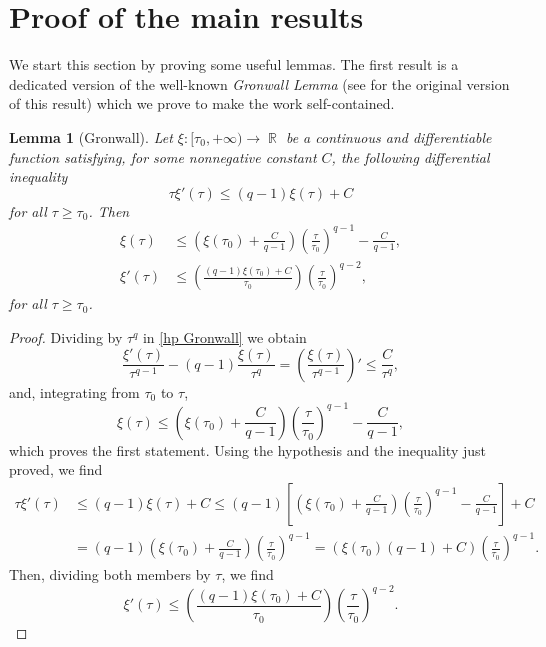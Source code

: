 \documentclass[12pt]{article}
\theoremstyle{definition}
\theoremstyle{plain}
\newtheorem{lemma}[teorema]{Lemma}
\theoremstyle{definition}
\DeclareMathOperator{\R}{\mathbb{R}}
\begin{document}
\section{Proof of the main results}\label{section4}
We start this section by proving some useful lemmas. The first result is a dedicated version of the well-known \emph{Gronwall Lemma} (see \cite{G} for the original version of this result) which we prove to make the work self-contained.
\begin{lemma}[Gronwall]\label{gronwall lemma}
    Let $\xi:[\tau_0,+\infty)\rightarrow\R$ be a continuous and differentiable function satisfying, for some nonnegative constant $C$, the following differential inequality
    \begin{equation}\label{hp Gronwall}
        \tau\xi'(\tau)\leq(q-1)\xi(\tau)+C
    \end{equation}
    for all $\tau\geq\tau_0$. Then
    \begin{equation*}
        \begin{split}
            \xi(\tau)&\leq \left(\xi(\tau_0)+\frac{C}{q-1} \right)\left(\frac{\tau}{\tau_0} \right)^{q-1}-\frac{C}{q-1},\\
            \xi'(\tau)&\leq \left(\frac{(q-1)\xi(\tau_0)+C}{\tau_0} \right)\left(\frac{\tau}{\tau_0} \right)^{q-2},
        \end{split}
    \end{equation*}
    for all $\tau\geq\tau_0$.
\end{lemma}
\begin{proof}
    Dividing by $\tau^{q}$ in \eqref{hp Gronwall} we obtain
    \begin{equation*}
        \frac{\xi'(\tau)}{\tau^{q-1}}-(q-1)\frac{\xi(\tau)}{\tau^{q}}=\left(\frac{\xi(\tau)}{\tau^{q-1}}\right)' \leq \frac{C}{\tau^{q}},
    \end{equation*}
    and, integrating from $\tau_0$ to $\tau$,
    \begin{equation*}
        \xi(\tau)\leq \left(\xi(\tau_0)+\frac{C}{q-1} \right)\left(\frac{\tau}{\tau_0} \right)^{q-1}-\frac{C}{q-1},
    \end{equation*}
    which proves the first statement. Using the hypothesis and the inequality just proved, we find
    \begin{equation*}
        \begin{split}
            \tau\xi'(\tau)&\leq(q-1)\xi(\tau)+C\leq(q-1)\left[\left(\xi(\tau_0)+\frac{C}{q-1} \right)\left(\frac{\tau}{\tau_0} \right)^{q-1}-\frac{C}{q-1}\right]+C\\
            &=(q-1)\left(\xi(\tau_0)+\frac{C}{q-1} \right)\left(\frac{\tau}{\tau_0} \right)^{q-1}=(\xi(\tau_0)(q-1)+C)\left(\frac{\tau}{\tau_0} \right)^{q-1}.
        \end{split}
    \end{equation*}
    Then, dividing both members by $\tau$, we find
    \begin{equation*}
        \xi'(\tau)\leq \left(\frac{(q-1)\xi(\tau_0)+C}{\tau_0} \right)\left(\frac{\tau}{\tau_0} \right)^{q-2}.
    \end{equation*}
\end{proof}
\end{document}
